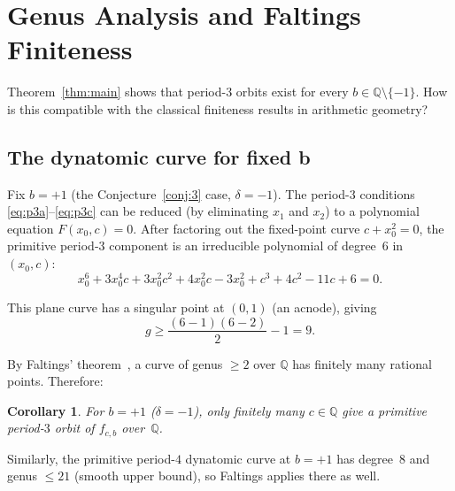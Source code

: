 \documentclass[11pt]{article}
\newtheorem{corollary}[theorem]{Corollary}
\theoremstyle{definition}
\theoremstyle{remark}
\begin{document}
\section{Genus Analysis and Faltings Finiteness}
\label{sec:genus}

Theorem~\ref{thm:main} shows that period-$3$ orbits exist for every
$b \in \mathbb{Q} \setminus \{-1\}$.  How is this compatible with the classical
finiteness results in arithmetic geometry?

\subsection{The dynatomic curve for fixed b}

Fix $b = +1$ (the Conjecture~\ref{conj:3} case, $\delta = -1$).  The period-$3$ conditions
\eqref{eq:p3a}--\eqref{eq:p3c} can be reduced (by eliminating $x_1$ and $x_2$)
to a polynomial equation $F(x_0, c) = 0$.  After factoring out the fixed-point
curve $c + x_0^2 = 0$, the primitive period-$3$ component is an irreducible
polynomial of degree~$6$ in~$(x_0, c)$:
%
\begin{equation}\label{eq:primitive3}
  x_0^6 + 3x_0^4 c + 3x_0^2 c^2 + 4x_0^2 c - 3x_0^2 + c^3 + 4c^2 - 11c + 6 = 0.
\end{equation}

This plane curve has a singular point at $(0, 1)$ (an acnode), giving
%
\begin{equation}\label{eq:genus}
  g \geq \frac{(6-1)(6-2)}{2} - 1 = 9.
\end{equation}

By Faltings' theorem~\cite{faltings1983}, a curve of genus $\geq 2$ over
$\mathbb{Q}$ has finitely many rational points.  Therefore:

\begin{corollary}\label{cor:faltings}
  For $b = +1$ ($\delta = -1$), only finitely many $c \in \mathbb{Q}$ give a primitive
  period-$3$ orbit of $f_{c,b}$ over~$\mathbb{Q}$.
\end{corollary}

Similarly, the primitive period-$4$ dynatomic curve at $b = +1$ has degree~$8$
and genus $\leq 21$ (smooth upper bound), so Faltings applies there as well.
\end{document}
